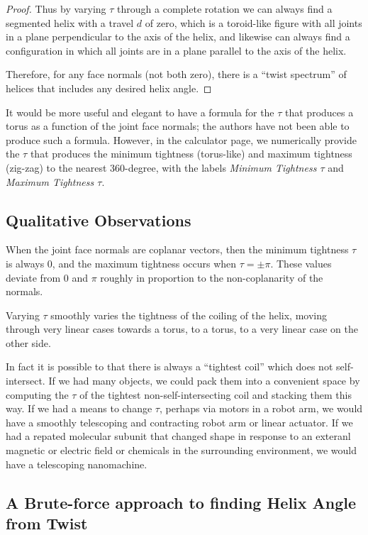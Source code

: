 \documentclass[11pt]{article}
\begin{document}
{\begin{proof}
    Thus by varying $\tau$ through a complete rotation we can always
    find a segmented helix with a travel $d$ of zero, which is a
    toroid-like figure with all joints in a plane perpendicular to the
    axis of the helix, and likewise can always find a configuration
    in which all joints are in a plane parallel to the axis of the helix.

    Therefore, for any face normals (not both zero), there is a ``twist spectrum'' of helices that includes
    any desired helix angle.
  \end{proof}


It would be more useful and elegant to have a formula for the $\tau$ that produces
a torus as a function of the joint face normals; the authors have not been able
to produce such a formula. However, in the calculator page, we numerically
provide the $\tau$ that produces the minimum tightness (torus-like) and maximum tightness (zig-zag) to the
nearest 360-degree,
with the labels {\em Minimum Tightness $\tau$} and {\em Maximum Tightness $\tau$}.

\subsection{Qualitative Observations}

When the joint face normals are coplanar vectors, then the minimum tightness $\tau$ is
always $0$, and the maximum tightness occurs when $\tau = \pm \pi$.
These values deviate from $0$ and $\pi$ roughly in proportion
to the non-coplanarity of the normals.

Varying $\tau$ smoothly varies the tightness of the coiling of the helix,
moving through very linear cases towards a torus,
to a torus, to a very linear case on the other side.

In fact it is possible to that there is always a ``tightest coil''
which does not self-intersect. If we had many objects,
we could pack them into a convenient space by computing the $\tau$
of the tightest non-self-intersecting coil and stacking them this way.
If we had a means to change $\tau$, perhaps via motors in a robot arm,
we would have a smoothly telescoping and contracting
robot arm or linear actuator.
If we had a repated molecular subunit that changed shape in
response to an exteranl magnetic or electric field or chemicals in the surrounding
environment, we would have a telescoping nanomachine.


\subsection{A Brute-force approach to finding Helix Angle from Twist}

}
\end{document}
